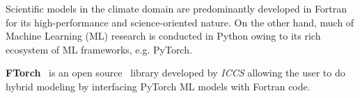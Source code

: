 Scientific models in the climate domain are predominantly developed in Fortran for its high-performance and science-oriented nature. On the other hand, much of Machine Learning (ML) research is conducted in Python owing to its rich ecosystem of ML frameworks, e.g. PyTorch. 

\textbf{FTorch}~\citep{Atkinson2025} is an open source \href{https://github.com/Cambridge-ICCS/FTorch}{\textcolor{black}{\faGithub}}~library developed by \emph{ICCS} allowing the user to do hybrid modeling by interfacing PyTorch ML models with Fortran code. \\

